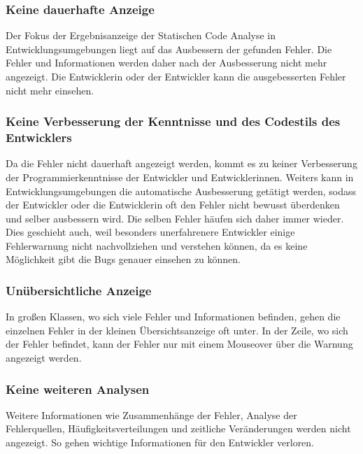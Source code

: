 \subsubsection{Keine dauerhafte Anzeige} 
Der Fokus der Ergebnisanzeige der Statischen Code Analyse in Entwicklungsumgebungen liegt auf das Ausbessern der gefunden Fehler. Die Fehler und Informationen werden daher nach der Ausbesserung nicht mehr angezeigt. Die Entwicklerin oder der Entwickler kann die ausgebesserten Fehler nicht mehr einsehen.

\subsubsection{Keine Verbesserung der Kenntnisse und des Codestils des Entwicklers} 
Da die Fehler nicht dauerhaft angezeigt werden, kommt es zu keiner Verbesserung der Programmierkenntnisse der Entwickler und Entwicklerinnen. Weiters kann in Entwicklungsumgebungen die automatische Ausbesserung getätigt werden, sodass der Entwickler oder die Entwicklerin oft den Fehler nicht bewusst überdenken und selber ausbessern wird. 
Die selben Fehler häufen sich daher immer wieder. Dies geschieht auch, weil besonders unerfahrenere Entwickler einige Fehlerwarnung nicht nachvollziehen und verstehen können, da es keine Möglichkeit gibt die Bugs genauer einsehen zu können. 

\subsubsection{Unübersichtliche Anzeige} 
In großen Klassen, wo sich viele Fehler und Informationen befinden, gehen die einzelnen Fehler in der kleinen Übersichtsanzeige oft unter. In der Zeile, wo sich der Fehler befindet, kann der Fehler nur mit einem Mouseover über die Warnung angezeigt werden. 

\subsubsection{Keine weiteren Analysen}
Weitere Informationen wie Zusammenhänge der Fehler, Analyse der Fehlerquellen, Häufigkeitsverteilungen und zeitliche Veränderungen werden nicht angezeigt. So gehen wichtige Informationen für den Entwickler verloren.